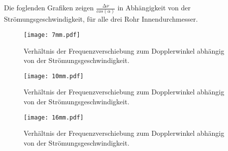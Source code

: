 \noindent
Die foglenden Grafiken zeigen $\frac{\increment \nu}{cos(\alpha)}$ in Abhängigkeit von der Strömungsgeschwindigkeit, für alle drei Rohr Innendurchmesser.

\begin{figure}
    \centering
    \texttt{[image: 7mm.pdf]}
    \caption{Verhältnis der Frequenzverschiebung zum Dopplerwinkel abhängig von der Strömungsgeschwindigkeit.}
    \label{fig:KeineAhnung}
\end{figure}

\begin{figure}
    \centering
    \texttt{[image: 10mm.pdf]}
    \caption{Verhältnis der Frequenzverschiebung zum Dopplerwinkel abhängig von der Strömungsgeschwindigkeit.}
    \label{fig:KeineAhnung}
\end{figure}
\begin{figure}
    \centering
    \texttt{[image: 16mm.pdf]}
    \caption{Verhältnis der Frequenzverschiebung zum Dopplerwinkel abhängig von der Strömungsgeschwindigkeit.}
    \label{fig:KeineAhnung}
\end{figure}